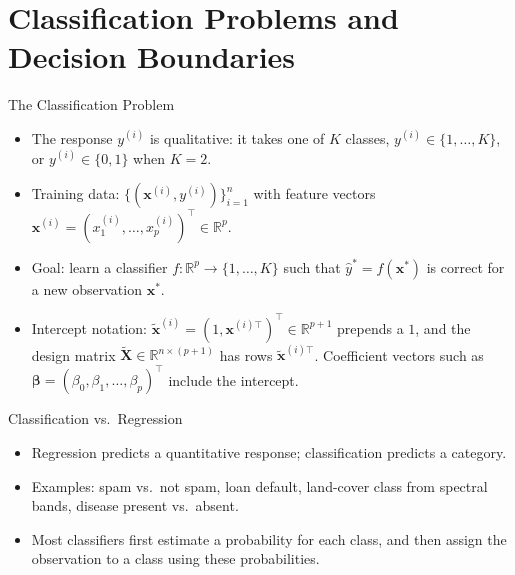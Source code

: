 \section{Classification Problems and Decision Boundaries}


\begin{frame}{The Classification Problem}
    \begin{itemize}
        \item The response $y^{(i)}$ is qualitative: it takes one of $K$ classes, $y^{(i)} \in \{1, \dots, K\}$, or $y^{(i)} \in \{0, 1\}$ when $K = 2$.
        \item Training data: $\{(\mathbf{x}^{(i)}, y^{(i)})\}_{i=1}^{n}$ with feature vectors $\mathbf{x}^{(i)} = (x_1^{(i)}, \dots, x_p^{(i)})^\top \in \mathbb{R}^p$.
        \item Goal: learn a classifier $f : \mathbb{R}^p \to \{1, \dots, K\}$ such that $\hat{y}^\ast = f(\mathbf{x}^\ast)$ is correct for a new observation $\mathbf{x}^\ast$.
        \item Intercept notation: $\tilde{\mathbf{x}}^{(i)} = (1, \mathbf{x}^{(i)\top})^\top \in \mathbb{R}^{p+1}$ prepends a $1$, and the design matrix $\tilde{\mathbf{X}} \in \mathbb{R}^{n \times (p+1)}$ has rows $\tilde{\mathbf{x}}^{(i)\top}$. Coefficient vectors such as $\symbf{\beta} = (\beta_0, \beta_1, \dots, \beta_p)^\top$ include the intercept.
    \end{itemize}
\end{frame}


\begin{frame}{Classification vs.\ Regression}
    \begin{itemize}
        \item Regression predicts a quantitative response; classification predicts a category.
        \item Examples: spam vs.\ not spam, loan default, land-cover class from spectral bands, disease present vs.\ absent.
        \item Most classifiers first estimate a probability for each class, and then assign the observation to a class using these probabilities.
    \end{itemize}
\end{frame}


